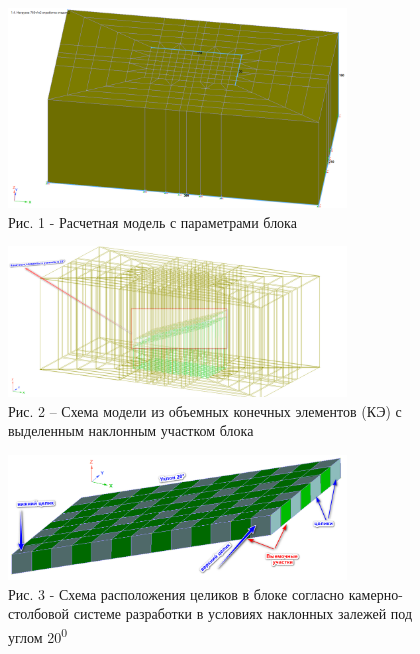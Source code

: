 \begin{figure}[H]
	\centering
	\includegraphics[width=0.8\textwidth]{media/gor/image6}
	\caption*{Рис. 1 - Расчетная модель с параметрами блока}
\end{figure}



\begin{figure}[H]
	\centering
	\includegraphics[width=0.8\textwidth]{media/gor/image7}
	\caption*{Рис. 2 -- Схема модели из объемных конечных элементов (КЭ) с
	выделенным наклонным участком блока}
\end{figure}



\begin{figure}[H]
	\centering
	\includegraphics[width=0.8\textwidth]{media/gor/image8}
	\caption*{Рис. 3 - Схема расположения целиков в блоке согласно
	камерно-столбовой системе разработки в условиях наклонных залежей под
	углом 20\textsuperscript{0}}
\end{figure}



